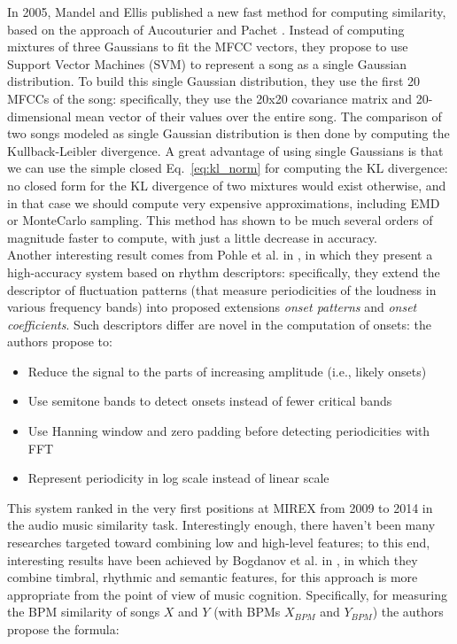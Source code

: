 In 2005, Mandel and Ellis published a new fast method for computing similarity, based on the approach of Aucouturier and Pachet \cite{mandel05}. Instead of computing mixtures of three Gaussians to fit the MFCC vectors, they propose to use Support Vector Machines (SVM) to represent a song as a single Gaussian distribution. To build this single Gaussian distribution, they use the first 20 MFCCs of the song: specifically, they use the 20x20 covariance matrix and 20-dimensional mean vector of their values over the entire song. The comparison of two songs modeled as single Gaussian distribution is then done by computing the Kullback-Leibler divergence. A great advantage of using single Gaussians is that we can use the simple closed Eq.~\ref{eq:kl_norm} for computing the KL divergence: no closed form for the KL divergence of two mixtures would exist otherwise, and in that case we should compute very expensive approximations, including EMD or MonteCarlo sampling. This method has shown to be much several orders of magnitude faster to compute, with just a little decrease in accuracy. \\ Another interesting result comes from Pohle et al. in \cite{pohle09}, in which they present a high-accuracy system based on rhythm descriptors: specifically, they extend the descriptor of fluctuation patterns (that measure periodicities of the loudness in various frequency bands) into proposed extensions \textit{onset patterns} and \textit{onset coefficients}. Such descriptors differ are novel in the computation of onsets: the authors propose to: 
\begin{itemize}
\item Reduce the signal to the parts of increasing amplitude (i.e., likely onsets)
\item Use semitone bands to detect onsets instead of fewer critical bands
\item Use Hanning window and zero padding before detecting periodicities with FFT
\item Represent periodicity in log scale instead of linear scale
\end{itemize}
This system ranked in the very first positions at MIREX from 2009 to 2014 in the audio music similarity task.  
Interestingly enough, there haven't been many researches targeted toward combining low and high-level features; to this end, interesting results have been achieved by Bogdanov et al. in \cite{dimi10}, in which they combine timbral, rhythmic and semantic features, for this approach is more appropriate from the point of view of music cognition. Specifically, for measuring the BPM similarity of songs $X$ and $Y$ (with BPMs $X_{BPM}$ and $Y_{BPM}$) the authors propose the formula:
